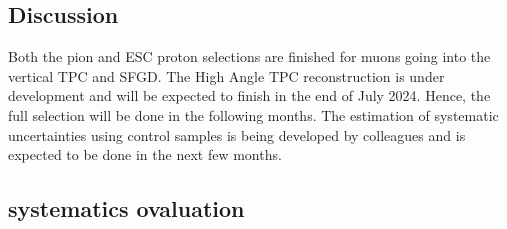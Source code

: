             

    \subsection{Discussion}
        Both the pion and ESC proton selections are finished for muons going into the vertical TPC and SFGD. The High Angle TPC reconstruction is under development and will be expected to finish in the end of July 2024. Hence, the full selection will be done in the following months. The estimation of systematic uncertainties using control samples is being developed by colleagues and is expected to be done in the next few months. 


     \subsection{systematics ovaluation}

